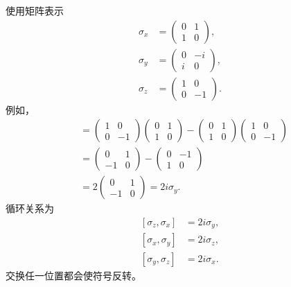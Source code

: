使用矩阵表示
\begin{equation}
\begin{aligned}
\sigma_x&=
\begin{pmatrix}0&1\\1&0\end{pmatrix},\\[0.4em]
\sigma_y&=
\begin{pmatrix}0&-i\\i&0\end{pmatrix},\\[0.4em]
\sigma_z&=
\begin{pmatrix}1&0\\0&-1\end{pmatrix}.
\end{aligned}
\end{equation}
例如，
\begin{align}
[\sigma_z,\sigma_x]
&=
\begin{pmatrix}1&0\\0&-1\end{pmatrix}
\begin{pmatrix}0&1\\1&0\end{pmatrix}
-
\begin{pmatrix}0&1\\1&0\end{pmatrix}
\begin{pmatrix}1&0\\0&-1\end{pmatrix}\\
&=
\begin{pmatrix}0&1\\-1&0\end{pmatrix}
-
\begin{pmatrix}0&-1\\1&0\end{pmatrix}\\
&=2
\begin{pmatrix}0&1\\-1&0\end{pmatrix}
=2i\sigma_y.
\end{align}
循环关系为
\begin{equation}
\begin{aligned}
[\sigma_z,\sigma_x]&=2i\sigma_y,\\
[\sigma_x,\sigma_y]&=2i\sigma_z,\\
[\sigma_y,\sigma_z]&=2i\sigma_x.
\end{aligned}
\label{eq:l5-pauli-commutators}
\end{equation}
交换任一位置都会使符号反转。

